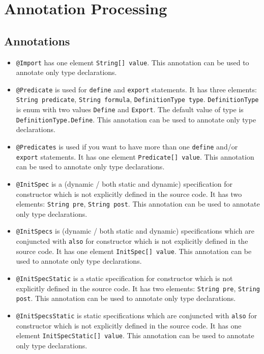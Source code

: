 \documentclass{article}
\begin{document}
\section{Annotation Processing}
\label{sec:annotationprocessing}

\subsection*{Annotations}

\begin{itemize}
\item \texttt{@Import} has one element \texttt{String[] value}. This annotation can be used to annotate only type declarations.
\item \texttt{@Predicate} is used for \texttt{define} and \texttt{export} statements. It has three elements: \texttt{String predicate}, \texttt{String formula}, \texttt{DefinitionType type}. \texttt{DefinitionType} is enum with two values \texttt{Define} and \texttt{Export}.  The default value of type is \texttt{DefinitionType.Define}. This annotation can be used to annotate only type declarations.
\item \texttt{@Predicates} is used if you want to have more than one  \texttt{define} and/or \texttt{export} statements. It has one element \texttt{Predicate[] value}. This annotation can be used to annotate only type declarations.
\item \texttt{@InitSpec} is a (dynamic / both static and dynamic) specification for constructor which is not explicitly defined in the source code. It has two elements: \texttt{String pre}, \texttt{String post}. This annotation can be used to annotate only type declarations.
\item \texttt{@InitSpecs} is (dynamic / both static and dynamic) specifications which are conjuncted with \texttt{also} for constructor which is not explicitly defined in the source code. It has one element \texttt{InitSpec[] value}. This annotation can be used to annotate only type declarations.
\item \texttt{@InitSpecStatic} is a static specification for constructor which is not explicitly defined in the source code. It has two elements: \texttt{String pre}, \texttt{String post}. This annotation can be used to annotate only type declarations.
\item \texttt{@InitSpecsStatic} is static specifications which are conjuncted with \texttt{also} for constructor which is not explicitly defined in the source code. It has one element \texttt{InitSpecStatic[] value}. This annotation can be used to annotate only type declarations.

\end{itemize}
\end{document}
